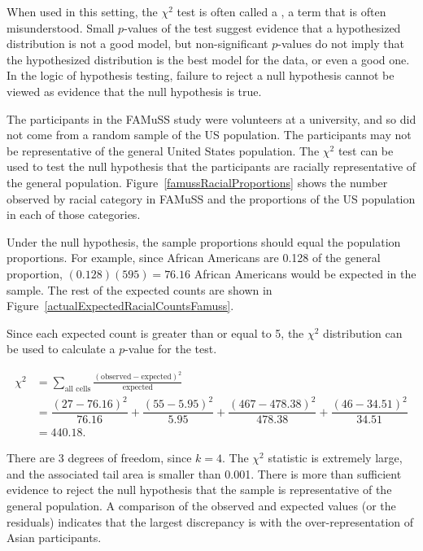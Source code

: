 When used in this setting, the $\chi^2$ test is often called a , a term that is often misunderstood.  Small $p$-values of the test suggest evidence that a hypothesized distribution is not a good model, but non-significant $p$-values do not imply that the hypothesized distribution is the best model for the data, or even a good one. In the logic of hypothesis testing, failure to reject a null hypothesis cannot be viewed as evidence that the null hypothesis is true.


\begin{examplewrap}
\begin{nexample}{The participants in the FAMuSS study were volunteers at a university, and so did not come from a random sample of the US population.  The participants may not be representative of the general United States population. The $\chi^2$ test can be used to test the null hypothesis that the participants are racially representative of the general population. Figure~\ref{famussRacialProportions} shows the number observed by racial category in FAMuSS and the proportions of the US population in each of those categories.\footnotemark{}}

Under the null hypothesis, the sample proportions should equal the population proportions. For example, since African Americans are 0.128 of the general proportion, $(0.128)(595) = 76.16$ African Americans would be expected in the sample.  The rest of the expected counts are shown in Figure~\ref{actualExpectedRacialCountsFamuss}.

Since each expected count is greater than or equal to 5,  the $\chi^2$ distribution can be used to calculate a $p$-value for the test.

\begin{align*}
\chi^2 &= \sum_{\text{all cells}} \frac{(\text{observed} - \text{expected})^2}{\text{expected}} \\
&= \dfrac{(27-76.16)^2}{76.16} + \dfrac{(55-5.95)^2}{5.95} + \dfrac{(467-478.38)^2}{478.38} + \dfrac{(46-34.51)^2}{34.51} \\
&=440.18.
\end{align*}	

There are 3 degrees of freedom, since $k = 4$. The $\chi^2$ statistic is extremely large, and the associated tail area is smaller than 0.001. There is more than sufficient evidence to reject the null hypothesis that the sample is representative of the general population. A comparison of the observed and expected values (or the residuals) indicates that the largest discrepancy is with the over-representation of Asian participants.
\end{nexample}
\end{examplewrap}

